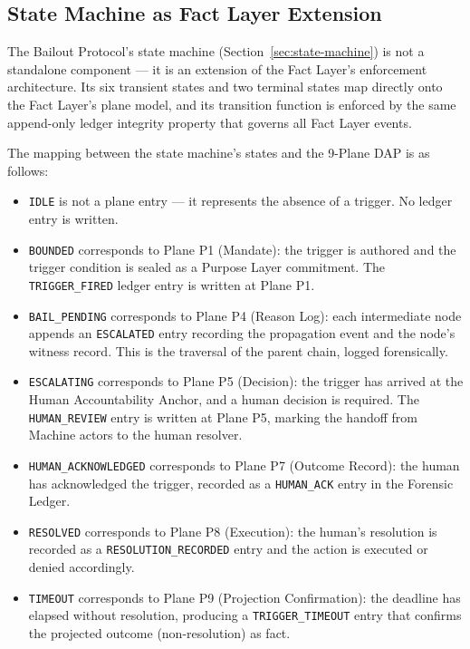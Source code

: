 \subsection{State Machine as Fact Layer Extension}
\label{sec:state-machine-fact-layer}

The Bailout Protocol's state machine (Section~\ref{sec:state-machine}) is not a standalone component --- it is an extension of the Fact Layer's enforcement architecture. Its six transient states and two terminal states map directly onto the Fact Layer's plane model, and its transition function is enforced by the same append-only ledger integrity property that governs all Fact Layer events.

The mapping between the state machine's states and the 9-Plane DAP is as follows:

\begin{itemize}
  \item \texttt{IDLE} is not a plane entry --- it represents the absence of a trigger. No ledger entry is written.

  \item \texttt{BOUNDED} corresponds to Plane P1 (Mandate): the trigger is authored and the trigger condition is sealed as a Purpose Layer commitment. The \texttt{TRIGGER\_FIRED} ledger entry is written at Plane P1.

  \item \texttt{BAIL\_PENDING} corresponds to Plane P4 (Reason Log): each intermediate node appends an \texttt{ESCALATED} entry recording the propagation event and the node's witness record. This is the traversal of the parent chain, logged forensically.

  \item \texttt{ESCALATING} corresponds to Plane P5 (Decision): the trigger has arrived at the Human Accountability Anchor, and a human decision is required. The \texttt{HUMAN\_REVIEW} entry is written at Plane P5, marking the handoff from Machine actors to the human resolver.

  \item \texttt{HUMAN\_ACKNOWLEDGED} corresponds to Plane P7 (Outcome Record): the human has acknowledged the trigger, recorded as a \texttt{HUMAN\_ACK} entry in the Forensic Ledger.

  \item \texttt{RESOLVED} corresponds to Plane P8 (Execution): the human's resolution is recorded as a \texttt{RESOLUTION\_RECORDED} entry and the action is executed or denied accordingly.

  \item \texttt{TIMEOUT} corresponds to Plane P9 (Projection Confirmation): the deadline has elapsed without resolution, producing a \texttt{TRIGGER\_TIMEOUT} entry that confirms the projected outcome (non-resolution) as fact.
\end{itemize}

